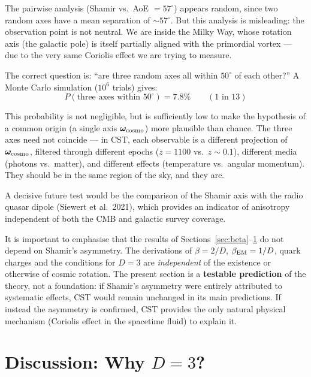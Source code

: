 \documentclass[10pt,a4paper]{article}
\begin{document}
The pairwise analysis (Shamir vs.\ AoE $= 57^\circ$) appears random, since two random axes have a mean separation of $\sim 57^\circ$. But this analysis is misleading: the observation point is not neutral. We are inside the Milky Way, whose rotation axis (the galactic pole) is itself partially aligned with the primordial vortex --- due to the very same Coriolis effect we are trying to measure.

The correct question is: ``are three random axes all within $50^\circ$ of each other?'' A Monte Carlo simulation ($10^6$ trials) gives:
\begin{equation}
P(\text{three axes within } 50^\circ) = 7.8\% \qquad (\text{1 in 13})
\end{equation}

This probability is not negligible, but is sufficiently low to make the hypothesis of a common origin (a single axis $\boldsymbol{\omega}_{\rm cosmo}$) more plausible than chance. The three axes need not coincide --- in CST, each observable is a different projection of $\boldsymbol{\omega}_{\rm cosmo}$, filtered through different epochs ($z = 1100$ vs.\ $z \sim 0.1$), different media (photons vs.\ matter), and different effects (temperature vs.\ angular momentum). They should be in the same region of the sky, and they are.

A decisive future test would be the comparison of the Shamir axis with the radio quasar dipole (Siewert et al.\ 2021), which provides an indicator of anisotropy independent of both the CMB and galactic survey coverage.

It is important to emphasise that the results of Sections~\ref{sec:beta}--\ref{sec:D3} do not depend on Shamir's asymmetry. The derivations of $\beta = 2/D$, $\beta_{\rm EM} = 1/D$, quark charges and the conditions for $D = 3$ are \textit{independent} of the existence or otherwise of cosmic rotation. The present section is a \textbf{testable prediction} of the theory, not a foundation: if Shamir's asymmetry were entirely attributed to systematic effects, CST would remain unchanged in its main predictions. If instead the asymmetry is confirmed, CST provides the only natural physical mechanism (Coriolis effect in the spacetime fluid) to explain it.


\section{Discussion: Why $D = 3$?}\label{sec:D3}
\end{document}
